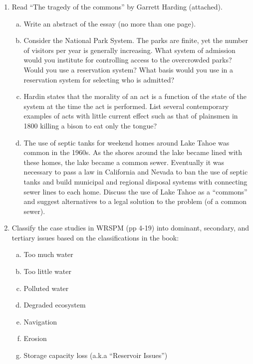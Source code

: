 \documentclass[12pt]{article}
\begin{document}
\begin{enumerate}
\item Read ``The tragedy of the commons'' by Garrett Harding (attached). 
\begin{enumerate}[a)]
\item Write an abstract of the essay (no more than one page).
\item Consider the National Park System.  The parks are finite, yet the number of visitors per year is generally increasing.  What system of admission would you institute for controlling access to the overcrowded parks?  Would you use a reservation system?  What basis would you use in a reservation system for selecting who is admitted?
\item Hardin states that the morality of an act is a function of the state of the system at the time the act is performed.  List several contemporary examples of acts with little current effect such as that of plainsmen in 1800 killing a bison to eat only the tongue?
\item The use of septic tanks for  weekend homes around Lake Tahoe was common in the 1960s.  As the shores around the lake became lined with these homes, the lake became a common sewer.  Eventually it was necessary to pass a law in California and Nevada to ban the use of septic tanks and build municipal and regional disposal systems with connecting sewer lines to each home.  Discuss the use of Lake Tahoe as a ``commons'' and suggest alternatives to a legal solution to the problem (of a common sewer).
\end{enumerate}
\item Classify the case studies in WRSPM (pp 4-19) into dominant, secondary, and tertiary issues based on the classifications in the book:
\begin{enumerate}[a)]
\item Too much water
\item Too little water
\item Polluted water
\item Degraded ecosystem
\item Navigation
\item Erosion
\item Storage capacity loss (a.k.a ``Reservoir Issues'')
\end{enumerate}
\end{enumerate}

\end{document}
